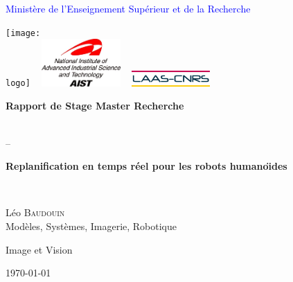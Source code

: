 \documentclass[a4paper,oneside,12pt]{article}
\newcommand{\leo}{L\'eo B\textsc{audouin}\xspace}
\newcommand{\eme}[1]{$#1^{\grave{e}me}$}
\newcommand{\logo}{images/Logo-UBP.png}
\newcommand{\titre}{Replanification en temps réel pour les robots humano\"\i des}
\begin{document}
\thispagestyle{empty}
\textcolor{blue}{Ministère de l'Enseignement Supérieur et de la Recherche}\\
\vspace{5mm}
\begin{centering}

  \texttt{[image: \\logo]} ~
  \includegraphics[width=3.0cm]{images/Logo-AIST.jpg} ~
  \includegraphics[width=3.0cm]{images/Logo-LAAS-CNRS.jpg}

\end{centering}

\vspace{5mm}
\begin{center} 
\begin{large}
\textbf{Rapport de Stage Master Recherche}
\end{large}
\\\vspace{3mm}--\vspace{3mm}\\
\begin{Huge}
\textbf{\titre}
\end{Huge}
\\
\vspace{10mm}
\begin{LARGE}
\leo\\

\vspace{5mm}
Modèles, Systèmes, Imagerie, Robotique\\
\end{LARGE}
\begin{large}
Image et Vision\\
\end{large}
\vspace{5mm}
\today
\end{center}
\end{document}
